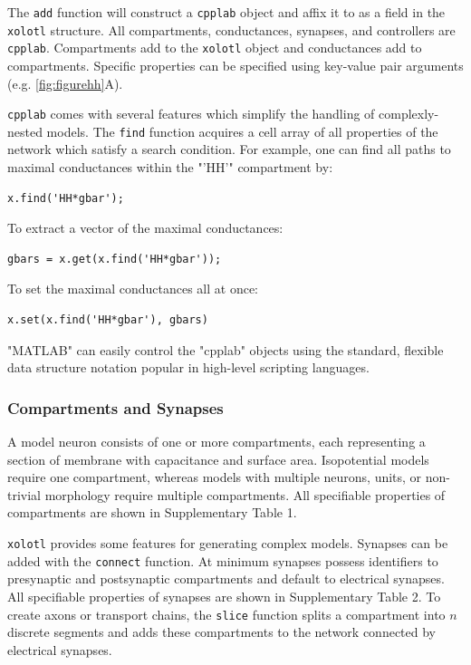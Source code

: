 \documentclass{frontiersSCNS} %
\begin{document}
The \texttt{add} function will construct a \texttt{cpplab} object and affix it to as a field in the \texttt{xolotl} structure. All compartments, conductances, synapses, and controllers are \texttt{cpplab}. Compartments add to the \texttt{xolotl} object and conductances add to compartments. Specific properties can be specified using key-value pair arguments (e.g. \ref{fig:figurehh}A).

\texttt{cpplab} comes with several features which simplify the handling of complexly-nested models. The \texttt{find} function acquires a cell array of all properties of the network which satisfy a search condition. For example, one can find all paths to maximal conductances within the "'HH'" compartment by: 

\begin{lstlisting}[style=Matlab-editor]
	x.find('HH*gbar');
\end{lstlisting}

To extract a vector of the maximal conductances:

\begin{lstlisting}[style=Matlab-editor]
	gbars = x.get(x.find('HH*gbar'));
\end{lstlisting}

To set the maximal conductances all at once:

\begin{lstlisting}[style=Matlab-editor]
	x.set(x.find('HH*gbar'), gbars)
\end{lstlisting}

"MATLAB" can easily control the "cpplab" objects using the standard, flexible data structure notation popular in high-level scripting languages.

\subsubsection{Compartments and Synapses}

A model neuron consists of one or more compartments, each representing a section of membrane with capacitance and surface area. Isopotential models require one compartment, whereas models with multiple neurons, units, or non-trivial morphology require multiple compartments. All specifiable properties of compartments are shown in Supplementary Table 1.

\texttt{xolotl} provides some features for generating complex models. Synapses can be added with the \texttt{connect} function. At minimum synapses possess identifiers to presynaptic and postsynaptic compartments and default to electrical synapses. All specifiable properties of synapses are shown in Supplementary Table 2. To create axons or transport chains, the \texttt{slice} function splits a compartment into $n$ discrete segments and adds these compartments to the network connected by electrical synapses.
\end{document}
